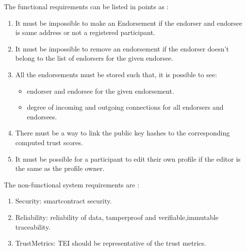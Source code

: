 The functional requirements can be listed in points as : \\
\begin{enumerate}
	\item It must be impossible to make an Endorsement if the endorser and
		endorsee is same address or not a registered participant.
	\item It must be impossible to remove an endorsement if the endorser
		doesn't belong to the list of endorsers for the given endorsee.
	\item All the endorsements must be stored such that, it is possible to see: 
		\begin{itemize}
			\item endorser and endorsee for the given endorsement.
			\item degree of incoming and outgoing connections for all endorsers and endorsees.
		\end{itemize}
	\item There must be a way to link the public key hashes to the
		corresponding computed trust scores. 
	\item It must be possible for a participant to edit their own profile if
		the editor is the same as the profile owner. 
\end{enumerate}

The non-functional system requirements are : 
\begin{enumerate}
	\item Security: smartcontract security.  
	\item Reliability: reliability of data, tamperproof and
		verifiable,immutable traceability.
	\item TrustMetrics: TEI should be representative of the trust metrics. 
\end{enumerate}

